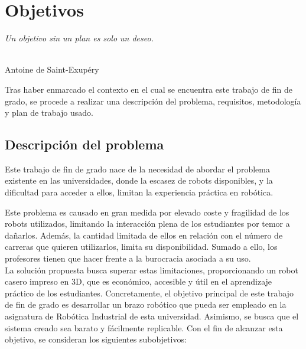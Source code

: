 \chapter{Objetivos}
\label{cap:capitulo3}

\begin{flushright}
\begin{minipage}[]{10cm}
\emph{Un objetivo sin un plan es solo un deseo.}\\
\end{minipage}\\

Antoine de Saint-Exupéry\\
\end{flushright}

\vspace{1cm}

Tras haber enmarcado el contexto en el cual se encuentra este trabajo de fin de grado, se procede a realizar
una descripción del problema, requisitos, metodología y plan de trabajo usado.
\section{Descripción del problema}
\label{sec:descripcion}
Este trabajo de fin de grado nace de la necesidad de abordar el problema existente en las universidades, donde la escasez de 
robots disponibles, y la dificultad para acceder a ellos, limitan la experiencia práctica en robótica.

Este problema es causado en gran medida por elevado coste y fragilidad de los robots utilizados, limitando la interacción plena de 
los estudiantes por temor a dañarlos. Además, la cantidad limitada de ellos en relación con el número de carreras que 
quieren utilizarlos, limita su disponibilidad. Sumado a ello, los profesores tienen que hacer frente a la burocracia asociada a su uso.
\\ 
La solución propuesta busca superar estas limitaciones, proporcionando un robot casero impreso en 3D, que es
económico, accesible y útil en el aprendizaje práctico de los estudiantes. Concretamente, el objetivo 
principal de este trabajo de fin de grado es desarrollar un brazo robótico que pueda ser empleado en la 
asignatura de Robótica Industrial de esta universidad. Asimismo, se busca que el sistema creado sea barato y fácilmente replicable.
\newpage
Con el fin de alcanzar esta objetivo, se consideran los siguientes subobjetivos:

